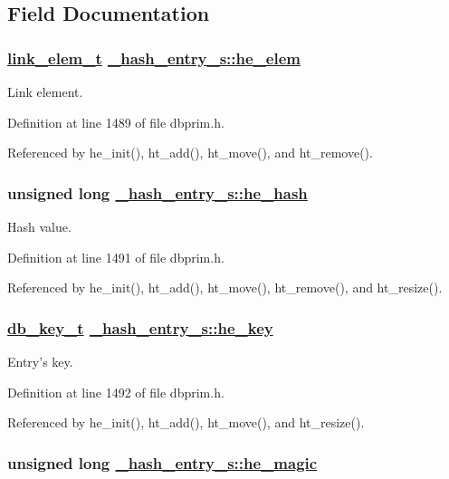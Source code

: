 \subsection{Field Documentation}
\hypertarget{struct__hash__entry__s_o1}{
\subsubsection[he\_\-elem]{\setlength{\rightskip}{0pt plus 5cm}\hyperlink{struct__link__elem__s}{link\_\-elem\_\-t} \hyperlink{struct__hash__entry__s_o1}{\_\-hash\_\-entry\_\-s::he\_\-elem}}}
\label{struct__hash__entry__s_o1}


Link element. 

Definition at line 1489 of file dbprim.h.

Referenced by he\_\-init(), ht\_\-add(), ht\_\-move(), and ht\_\-remove().\hypertarget{struct__hash__entry__s_o3}{
\subsubsection[he\_\-hash]{\setlength{\rightskip}{0pt plus 5cm}unsigned long \hyperlink{struct__hash__entry__s_o3}{\_\-hash\_\-entry\_\-s::he\_\-hash}}}
\label{struct__hash__entry__s_o3}


Hash value. 

Definition at line 1491 of file dbprim.h.

Referenced by he\_\-init(), ht\_\-add(), ht\_\-move(), ht\_\-remove(), and ht\_\-resize().\hypertarget{struct__hash__entry__s_o4}{
\subsubsection[he\_\-key]{\setlength{\rightskip}{0pt plus 5cm}\hyperlink{struct__db__key__s}{db\_\-key\_\-t} \hyperlink{struct__hash__entry__s_o4}{\_\-hash\_\-entry\_\-s::he\_\-key}}}
\label{struct__hash__entry__s_o4}


Entry's key. 

Definition at line 1492 of file dbprim.h.

Referenced by he\_\-init(), ht\_\-add(), ht\_\-move(), and ht\_\-resize().\hypertarget{struct__hash__entry__s_o0}{
\subsubsection[he\_\-magic]{\setlength{\rightskip}{0pt plus 5cm}unsigned long \hyperlink{struct__hash__entry__s_o0}{\_\-hash\_\-entry\_\-s::he\_\-magic}}}
\label{struct__hash__entry__s_o0}


